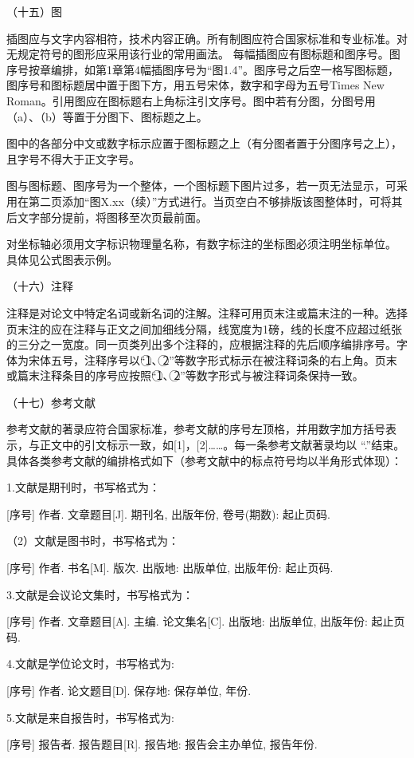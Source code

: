 （十五）图

插图应与文字内容相符，技术内容正确。所有制图应符合国家标准和专业标准。对无规定符号的图形应采用该行业的常用画法。
每幅插图应有图标题和图序号。图序号按章编排，如第1章第4幅插图序号为“图1.4”。图序号之后空一格写图标题，图序号和图标题居中置于图下方，用五号宋体，数字和字母为五号Times New Roman。引用图应在图标题右上角标注引文序号。图中若有分图，分图号用（a）、（b）等置于分图下、图标题之上。

图中的各部分中文或数字标示应置于图标题之上（有分图者置于分图序号之上），且字号不得大于正文字号。

图与图标题、图序号为一个整体，一个图标题下图片过多，若一页无法显示，可采用在第二页添加“图X.xx（续）”方式进行。当页空白不够排版该图整体时，可将其后文字部分提前，将图移至次页最前面。

对坐标轴必须用文字标识物理量名称，有数字标注的坐标图必须注明坐标单位。
具体见公式图表示例。

（十六）注释

注释是对论文中特定名词或新名词的注解。注释可用页末注或篇末注的一种。选择页末注的应在注释与正文之间加细线分隔，线宽度为1磅，线的长度不应超过纸张的三分之一宽度。同一页类列出多个注释的，应根据注释的先后顺序编排序号。字体为宋体五号，注释序号以“\textcircled{1}、\textcircled{2}”等数字形式标示在被注释词条的右上角。页末或篇末注释条目的序号应按照“\textcircled{1}、\textcircled{2}”等数字形式与被注释词条保持一致。

（十七）参考文献

参考文献的著录应符合国家标准，参考文献的序号左顶格，并用数字加方括号表示，与正文中的引文标示一致，如[1]，[2]……。每一条参考文献著录均以 “.”结束。具体各类参考文献的编排格式如下（参考文献中的标点符号均以半角形式体现）：

1.文献是期刊时，书写格式为：

[序号] 作者. 文章题目[J]. 期刊名, 出版年份, 卷号(期数): 起止页码.

（2）文献是图书时，书写格式为：

[序号] 作者. 书名[M]. 版次. 出版地: 出版单位, 出版年份: 起止页码.

3.文献是会议论文集时，书写格式为：

[序号] 作者. 文章题目[A]. 主编. 论文集名[C]. 出版地: 出版单位, 出版年份: 起止页码.

4.文献是学位论文时，书写格式为:

[序号] 作者. 论文题目[D]. 保存地: 保存单位, 年份.

5.文献是来自报告时，书写格式为:

[序号] 报告者. 报告题目[R]. 报告地: 报告会主办单位, 报告年份.

